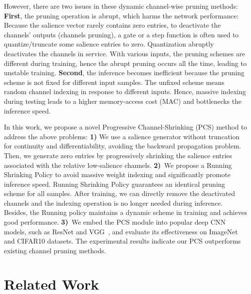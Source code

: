 \documentclass[lettersize,journal]{IEEEtran}
\begin{document}
However, there are two issues in these dynamic channel-wise pruning methods: 
\textbf{First}, the pruning operation is abrupt, which harms the network performance: Because the salience vector rarely contains zero entries, to deactivate the channels' outputs (channels pruning), a gate or a step function is often used to quantize/truncate some salience entries to zero. Quantization abruptly deactivates the channels in service. With various inputs, the pruning schemes are different during training, hence the abrupt pruning occurs all the time, leading to unstable training. 
\textbf{Second}, the inference becomes inefficient because the pruning scheme is not fixed for different input samples. The unfixed scheme means random channel indexing in response to different inputs. Hence, massive indexing during testing leads to a higher memory-access cost (MAC) and bottlenecks the inference speed. 

In this work, we propose a novel Progressive Channel-Shrinking (PCS) method to address the above problems: 
\textbf{1)} 
We use a salience generator without truncation for continuity and differentiability, avoiding the backward propagation problem. Then, we generate zero entries by progressively shrinking the salience entries associated with the relative low-salience channels. \textbf{2)}~We propose a Running Shrinking Policy to avoid massive weight indexing and significantly promote inference speed. Running Shrinking Policy guarantees an identical pruning scheme for all samples. After training, we can directly remove the deactivated channels and the indexing operation is no longer needed during inference. Besides, the Running policy maintains a dynamic scheme in training and achieves good performance. \textbf{3)}~We embed the PCS module into popular deep CNN models, such as ResNet \cite{he2016deep} and VGG~\cite{simonyan2014very}, and evaluate its effectiveness on ImageNet and CIFAR10 datasets. 
The experimental results indicate our PCS outperforms existing channel pruning methods.



\section{Related Work}
\label{Related Work}
\end{document}
